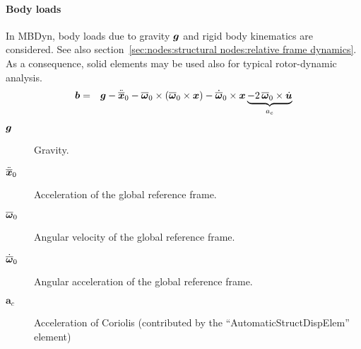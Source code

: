 \paragraph{Body loads}
In MBDyn, body loads due to gravity $\bm{g}$ and rigid body kinematics are considered. See also section~\ref{sec:nodes:structural nodes:relative frame dynamics}.
As a consequence, solid elements may be used also for typical rotor-dynamic analysis.
\begin{eqnarray}
\bm{b} & = & \bm{g} - \ddot{\overline{\bm{x}}}_0 - \overline{\bm{\omega}}_0 \times \left(\overline{\bm{\omega}}_0 \times \bm{x} \right) - \dot{\overline{\bm{\omega}}}_0 \times \bm{x} \underbrace{- 2 \, \overline{\bm{\omega}}_0 \times \dot{\bm{u}}}_{a_c}
\end{eqnarray}

\begin{description}
\item[$\bm{g}$] Gravity.
\item[$\ddot{\overline{\bm{x}}}_0$] Acceleration of the global reference frame.
\item[$\overline{\bm{\omega}}_0$]  Angular velocity of the global reference frame.
\item[$\dot{\overline{\bm{\omega}}}_0$]  Angular acceleration of the global reference frame.
\item[$\boldsymbol{a}_c$] Acceleration of Coriolis (contributed by the ``AutomaticStructDispElem'' element)
\end{description}

